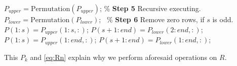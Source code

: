 \documentclass{book}
\makeatletter
\def\my@tag@font{\normalsize}
\let\amsmath@eqref\eqref
\renewcommand\eqref[1]{{\let\my@tag@font\relax\amsmath@eqref{#1}}}
\theoremstyle{remark}
\makeatother
\begin{document}
\begin{multicols}{2}
\begin{algorithm}[htbp]
\begin{algorithmic}[1]
        \State $P_{upper} = \text{Permutation}(P_{upper})$; \qquad\qquad\qquad\% \textbf{Step 5} Recursive executing.
        \State $P_{lower} = \text{Permutation}(P_{lower})$;
         \qquad\qquad\qquad\qquad\qquad\qquad\ \% \textbf{Step 6} Remove zero rows, if $s$ is odd.
            \State $P(1:s) = P_{upper}(1:s, :)$;
            \State $P(s+1:end) = P_{lower}(2:end, :)$;
        \Else
            \State $P(1:s) = P_{upper}(1:end, :)$;
            \State $P(s+1:end) = P_{lower}(1:end, :)$;
        \End
    \End 
    \end{algorithmic}
\end{algorithm}
This $P_k$ and \eqref{eq:Rn} explain why we perform aforesaid operations on $R$.


\end{multicols}
\end{document}
